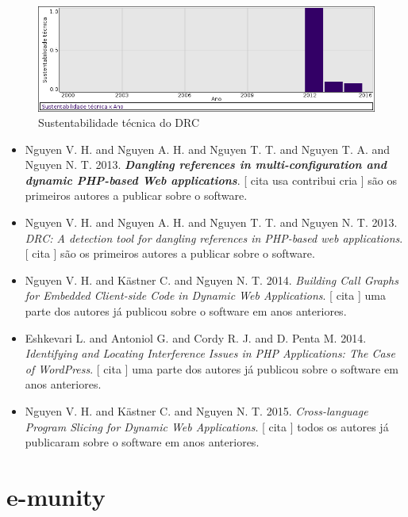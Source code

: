 \begin{figure}[h]
  \center
  \includegraphics[scale=0.50]{result-documents/charts/drc.png}
  \caption{Sustentabilidade técnica do DRC}
\end{figure}


\begin{itemize}
\item Nguyen V. H. and Nguyen A. H. and Nguyen T. T. and Nguyen T. A. and Nguyen N. T.
      2013.
        \textbf{\textit{ Dangling references in multi-configuration and dynamic PHP-based Web applications}}.
      [
          cita
          usa
          contribui
          cria
      ]
são os primeiros autores a publicar sobre o software.
\item Nguyen V. H. and Nguyen A. H. and Nguyen T. T. and Nguyen N. T.
      2013.
        \textit{ DRC: A detection tool for dangling references in PHP-based web applications}.
      [
          cita
      ]
são os primeiros autores a publicar sobre o software.
\item Nguyen V. H. and K\"{a}stner C. and Nguyen N. T.
      2014.
        \textit{ Building Call Graphs for Embedded Client-side Code in Dynamic Web Applications}.
      [
          cita
      ]
uma parte dos autores já publicou sobre o software em anos anteriores.
\item Eshkevari L. and Antoniol G. and Cordy R. J. and D. Penta M.
      2014.
        \textit{ Identifying and Locating Interference Issues in PHP Applications: The Case of WordPress}.
      [
          cita
      ]
uma parte dos autores já publicou sobre o software em anos anteriores.
\item Nguyen V. H. and K\"{a}stner C. and Nguyen N. T.
      2015.
        \textit{ Cross-language Program Slicing for Dynamic Web Applications}.
      [
          cita
      ]
todos os autores já publicaram sobre o software em anos anteriores.
\end{itemize}
\section{e-munity}

